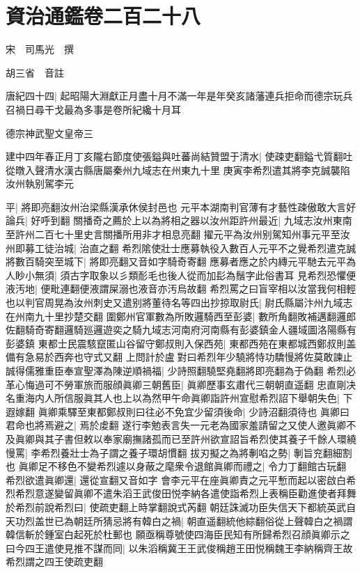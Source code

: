\chapter{資治通鑑卷二百二十八}
宋　司馬光　撰

胡三省　音註

唐紀四十四|{
	起昭陽大淵獻正月盡十月不滿一年是年癸亥諸藩連兵拒命而德宗玩兵召禍日尋干戈最為多事是卷所紀纔十月耳}


德宗神武聖文皇帝三

建中四年春正月丁亥隴右節度使張鎰與吐蕃尚結贊盟于清水|{
	使疎吏翻鎰弋質翻吐從暾入聲清水漢古縣唐屬秦州九域志在州東九十里}
庚寅李希烈遣其將李克誠襲陷汝州執别駕李元

平|{
	將即亮翻汝州治梁縣漢承休侯封邑也}
元平本湖南判官薄有才藝性疎傲敢大言好論兵|{
	好呼到翻}
關播奇之薦於上以為將相之器以汝州距許州最近|{
	九域志汝州東南至許州二百七十里史言關播所用非才相息亮翻}
擢元平為汝州别駕知州事元平至汝州即募工徒治城|{
	治直之翻}
希烈隂使壯士應募執役入數百人元平不之覺希烈遣克誠將數百騎突至城下|{
	將即亮翻又音如字騎奇寄翻}
應募者應之於内縳元平馳去元平為人眇小無須|{
	須古字取象以彡類耏毛也後人從而加髟為鬚字此俗書耳}
見希烈恐懼便液汚地|{
	便毗連翻便液謂屎溺也液音亦汚烏故翻}
希烈罵之曰盲宰相以汝當我何相輕也以判官周晃為汝州刺史又遣别將董待名等四出抄掠取尉氏|{
	尉氏縣屬汴州九域志在州南九十里抄楚交翻}
圍鄭州官軍數為所敗邏騎西至彭婆|{
	數所角翻敗補邁翻邏郎佐翻騎奇寄翻邏騎廵邏遊奕之騎九域志河南府河南縣有彭婆鎮金人疆域圖洛陽縣有彭婆鎮}
東都士民震駭竄匿山谷留守鄭叔則入保西苑|{
	東都西苑在東都城西鄭叔則盖備有急易於西奔也守式又翻}
上問計於盧對曰希烈年少驍將恃功驕慢將佐莫敢諫止誠得儒雅重臣奉宣聖澤為陳逆順禍福|{
	少詩照翻驍堅堯翻將即亮翻為于偽翻}
希烈必革心悔過可不勞軍旅而服顔眞卿三朝舊臣|{
	眞卿歷事玄肅代三朝朝直遥翻}
忠直剛决名重海内人所信服眞其人也上以為然甲午命眞卿詣許州宣慰希烈詔下舉朝失色|{
	下遐嫁翻}
眞卿乘驛至東都鄭叔則曰往必不免宜少留須後命|{
	少詩沼翻須待也}
眞卿曰君命也將焉避之|{
	焉於䖍翻}
遂行李勉表言失一元老為國家羞請留之又使人邀眞卿不及眞卿與其子書但敕以奉家廟撫諸孤而已至許州欲宣詔旨希烈使其養子千餘人環繞慢罵|{
	李希烈養壯士為子謂之養子環胡慣翻}
拔刃擬之為將剸啗之勢|{
	剸旨兖翻細割也}
眞卿足不移色不變希烈遽以身蔽之麾衆令退館眞卿而禮之|{
	令力丁翻館古玩翻}
希烈欲遣眞卿還|{
	還從宣翻又音如字}
會李元平在座眞卿責之元平慙而起以密啟白希烈希烈意遂變留眞卿不遣朱滔王武俊田悦李納各遣使詣希烈上表稱臣勸進使者拜舞於希烈前說希烈曰|{
	使疏吏翻上時掌翻說式芮翻}
朝廷誅滅功臣失信天下都統英武自天功烈盖世已為朝廷所猜忌將有韓白之禍|{
	朝直遥翻統他綜翻俗從上聲韓白之禍謂韓信斬於鍾室白起死於杜郵也}
願亟稱尊號使四海臣民知有所歸希烈召顔眞卿示之曰今四王遣使見推不謀而同|{
	以朱滔稱冀王王武俊稱趙王田悦稱魏王李納稱齊王故希烈謂之四王使疏吏翻}
